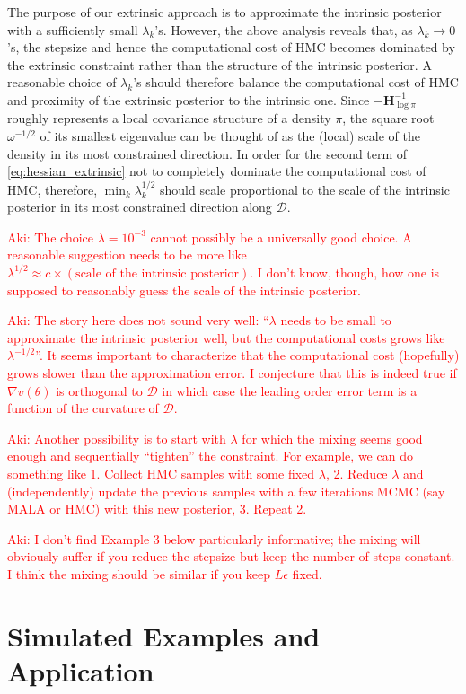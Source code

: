 \documentclass[10pt]{article}
\newcommand{\aki}[1]{\textcolor{red}{Aki: #1}}
\newcommand{\mc}[1]{\mathcal{#1}}
\DeclareMathOperator{\1}{\mathbbm{1}}
\newcommand{\dt}{\epsilon} %
\newcommand{\hess}{\mathbf{H}} %
\begin{document}
The purpose of our extrinsic approach is to approximate the intrinsic posterior with a sufficiently small $\lambda_k$'s. However, the above analysis reveals that, as $\lambda_k \to 0$'s, the stepsize and hence the computational cost of HMC becomes dominated by the extrinsic constraint rather than the structure of the intrinsic posterior. A reasonable choice of $\lambda_k$'s should therefore balance the computational cost of HMC and  proximity of the extrinsic posterior to the intrinsic one. Since $- \hess_{\log \pi}^{-1}$ roughly represents a local covariance structure of a density $\pi$, the square root $\omega^{-1 / 2}$ of its smallest eigenvalue can be thought of as the (local) scale of the density in its most constrained direction. In order for the second term of \eqref{eq:hessian_extrinsic} not to completely dominate the computational cost of HMC, therefore, $\min_k \lambda_k^{1/2}$ should scale proportional to the scale of the intrinsic posterior in its most constrained direction along $\mc D$.

\aki{The choice $\lambda = 10^{-3}$ cannot possibly be a universally good choice. A reasonable suggestion needs to be more like $\lambda^{1/2} \approx c \times (\text{scale of the intrinsic posterior})$. I don't know, though, how one is supposed to reasonably guess the scale of the intrinsic posterior. }

\aki{The story here does not sound very well: ``$\lambda$ needs to be small to approximate the intrinsic posterior well, but the computational costs grows like $\lambda^{-1/2}$''. It seems important to characterize that the computational cost (hopefully) grows slower than the approximation error. I conjecture that this is indeed true if $\nabla v(\theta)$ is orthogonal to $\mc D$ in which case the leading order error term is a function of the curvature of $\mc D$.}

\aki{Another possibility is to start with $\lambda$ for which the mixing seems good enough and sequentially ``tighten'' the constraint. For example, we can do something like 1. Collect HMC samples with some fixed $\lambda$, 2. Reduce $\lambda$ and (independently) update the previous samples with a few iterations MCMC (say MALA or HMC) with this new posterior, 3. Repeat 2.}

\aki{I don't find Example 3 below particularly informative; the mixing will obviously suffer if you reduce the stepsize but keep the number of steps constant. I think the mixing should be similar if you keep $L \dt$ fixed. } 

\section{Simulated Examples and Application}
\end{document}
